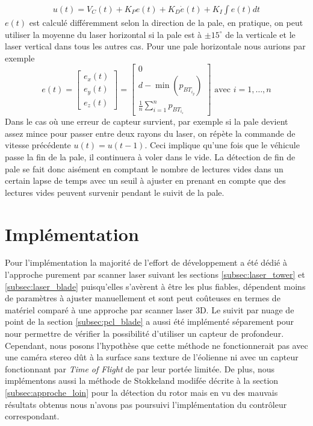 \begin{align}
  u(t) = V_C(t) + K_P e(t) + K_D\dot{e}(t) + K_I\int{e(t)dt}
  \label{eq:pid_laser_blade}
\end{align}
$e(t)$ est calculé différemment selon la direction de la pale, en pratique, on peut utiliser la moyenne du laser horizontal si la pale est à $\pm15^{\circ}$ de la verticale et le laser vertical dans tous les autres cas. Pour une pale horizontale nous aurions par exemple
\[
e(t) = \begin{bmatrix}e_x(t) \\ e_y(t) \\ e_z(t)\end{bmatrix} =
\begin{bmatrix}
0 \\ d - \min(p_{{BT}_{i_y}}) \\ \frac{1}{n}\sum_{i=1}^{n}p_{{BT}_{i_z}}
\end{bmatrix} \text{ avec } i=1,\ldots,n
\]
Dans le cas où une erreur de capteur survient, par exemple si la pale devient assez mince pour passer entre deux rayons du laser, on répète la commande de vitesse précédente $u(t) = u(t-1)$. Ceci implique qu'une fois que le véhicule passe la fin de la pale, il continuera à voler dans le vide. La détection de fin de pale se fait donc aisément en comptant le nombre de lectures vides dans un certain lapse de temps avec un seuil à ajuster en prenant en compte que des lectures vides peuvent survenir pendant le suivit de la pale.

% 

\section{Implémentation}

Pour l'implémentation la majorité de l'effort de développement a été dédié à l'approche purement par scanner laser suivant les sections \ref{subsec:laser_tower} et \ref{subsec:laser_blade} puisqu'elles s'avèrent à être les plus fiables, dépendent moins de paramètres à ajuster manuellement et sont peut coûteuses en termes de matériel comparé à une approche par scanner laser 3D. Le suivit par nuage de point de la section \ref{subsec:pcl_blade} a aussi été implémenté séparement pour nour permettre de vérifier la possibilité d'utiliser un capteur de profondeur. Cependant, nous posons l'hypothèse que cette méthode ne fonctionnerait pas avec une caméra stereo dût à la surface sans texture de l'éolienne ni avec un capteur fonctionnant par \textit{Time of Flight} de par leur portée limitée.
De plus, nous implémentons aussi la méthode de Stokkeland modifée décrite à la section \ref{subsec:approche_loin} pour la détection du rotor mais en vu des mauvais résultats obtenus nous n'avons pas poursuivi l'implémentation du contrôleur correspondant.

